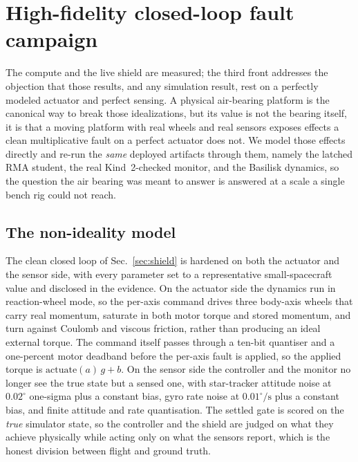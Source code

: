 \documentclass[11pt]{article}
\begin{document}
\section{High-fidelity closed-loop fault campaign}
\label{sec:hifi}
The compute and the live shield are measured; the third front addresses the objection that those
results, and any simulation result, rest on a perfectly modeled actuator and perfect sensing. A
physical air-bearing platform is the canonical way to break those idealizations, but its value is
not the bearing itself, it is that a moving platform with real wheels and real sensors exposes
effects a clean multiplicative fault on a perfect actuator does not. We model those effects
directly and re-run the \emph{same} deployed artifacts through them, namely the latched RMA
student, the real Kind~2-checked monitor, and the Basilisk dynamics, so the question the air
bearing was meant to answer is answered at a scale a single bench rig could not reach.

\subsection{The non-ideality model} The clean closed loop of Sec.~\ref{sec:shield} is hardened on
both the actuator and the sensor side, with every parameter set to a representative
small-spacecraft value and disclosed in the evidence. On the actuator side the dynamics run in
reaction-wheel mode, so the per-axis command drives three body-axis wheels that carry real
momentum, saturate in both motor torque and stored momentum, and turn against Coulomb and viscous
friction, rather than producing an ideal external torque. The command itself passes through a
ten-bit quantiser and a one-percent motor deadband before the per-axis fault is applied, so the
applied torque is $\mathrm{actuate}(a)\,g + b$. On the sensor side the controller and the monitor
no longer see the true state but a sensed one, with star-tracker attitude noise at $0.02^\circ$
one-sigma plus a constant bias, gyro rate noise at $0.01^\circ/\mathrm{s}$ plus a constant bias,
and finite attitude and rate quantisation. The settled gate is scored on the \emph{true} simulator
state, so the controller and the shield are judged on what they achieve physically while acting
only on what the sensors report, which is the honest division between flight and ground truth.
\end{document}
